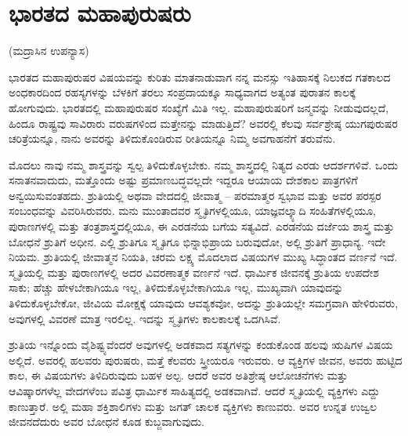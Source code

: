 
\chapter{ಭಾರತದ ಮಹಾಪುರುಷರು}

\begin{center}
(ಮದ್ರಾಸಿನ ಉಪನ್ಯಾಸ)
\end{center}

ಭಾರತದ ಮಹಾಪುರುಷರ ವಿಷಯವನ್ನು ಕುರಿತು ಮಾತನಾಡುವಾಗ ನನ್ನ ಮನಸ್ಸು ಇತಿಹಾಸಕ್ಕೆ ನಿಲುಕದ ಗತಕಾಲದ ಅಂಧಕಾರದಿಂದ ರಹಸ್ಯಗಳನ್ನು ಬೆಳಕಿಗೆ ತರಲು ಸಂಪ್ರದಾಯಕ್ಕೂ ಸಾಧ್ಯವಾಗದ ಅತ್ಯಂತ ಪುರಾತನ ಕಾಲಕ್ಕೆ ಹೋಗುವುದು. ಭಾರತದಲ್ಲಿ ಮಹಾಪುರುಷರ ಸಂಖ್ಯೆಗೆ ಮಿತಿ ಇಲ್ಲ. ಮಹಾಪುರುಷರಿಗೆ ಜನ್ಮವನ್ನು ನೀಡುವುದಲ್ಲದೆ, ಹಿಂದೂ ರಾಷ್ಟ್ರವು ಸಾವಿರಾರು ವರುಷಗಳಿಂದ ಮತ್ತೇನನ್ನು ಮಾಡುತ್ತಿದೆ? ಅವರಲ್ಲಿ ಕೆಲವು ಸರ್ವಶ್ರೇಷ್ಠ ಯುಗಪುರುಷರ ಚರಿತ್ರೆಯನ್ನೂ, ನಾನು ಅವರನ್ನು ತಿಳಿದುಕೊಂಡಿರುವ ರೀತಿಯನ್ನೂ ನಿಮ್ಮ ಅವಗಾಹನೆಗೆ ತರುವೆನು. 

ಮೊದಲು ನಾವು ನಮ್ಮ ಶಾಸ್ತ್ರವನ್ನು ಸ್ವಲ್ಪ ತಿಳಿದುಕೊಳ್ಳಬೇಕು. ನಮ್ಮ ಶಾಸ್ತ್ರದಲ್ಲಿ ನಿತ್ಯದ ಎರಡು ಆದರ್ಶಗಳಿವೆ. ಒಂದು ಸನಾತನವಾದುದು, ಮತ್ತೊಂದು ಅಷ್ಟು ಪ್ರಮಾಣಬದ್ಧವಲ್ಲದೇ ಇದ್ದರೂ ಆಯಾಯ ದೇಶಕಾಲ ಪಾತ್ರಗಳಿಗೆ ಅನ್ವಯಿಸುವಂತಹದು. ಶ್ರುತಿಯಲ್ಲಿ ಅಥವಾ ವೇದದಲ್ಲಿ ಜೀವಾತ್ಮ – ಪರಮಾತ್ಮರ ಸ್ವಭಾವ ಮತ್ತು ಅವರ ಪರಸ್ಪರ ಸಂಬಂಧವನ್ನು ವಿವರಿಸಿರುವರು. ಮನು ಮುಂತಾದವರ ಸ್ಮೃತಿಗಳಲ್ಲಿಯೂ, ಯಾಜ್ಞವಲ್ಕ್ಯಾದಿ ಸಂಹಿತೆಗಳಲ್ಲಿಯೂ, ಪುರಾಣಗಳಲ್ಲಿ ಮತ್ತು ತಂತ್ರಶಾಸ್ತ್ರದಲ್ಲಿಯೂ, ಈ ಎರಡನೆಯ ಬಗೆಯ ಸತ್ಯವಿದೆ. ಎರಡನೆಯ ದರ್ಜೆಯ ಶಾಸ್ತ್ರ ಮತ್ತು ಬೋಧನೆ ಶ್ರುತಿಗೆ ಅಧೀನ. ಎಲ್ಲಿ ಶ್ರುತಿಗೂ ಸ್ಮೃತಿಗೂ ಭಿನ್ನಾಭಿಪ್ರಾಯ ಬರುವುದೋ, ಅಲ್ಲಿ ಶ್ರುತಿಗೆ ಪ್ರಾಧಾನ್ಯ. ಇದೇ ನಿಯಮ. ಶ್ರುತಿಯಲ್ಲಿ ಜೀವಾತ್ಮನ ನಿಯತಿ, ಚರಮ ಲಕ್ಷ್ಯ ಮೊದಲಾದ ವಿಷಯಗಳ ಮುಖ್ಯ ಸಿದ್ಧಾಂತದ ವರ್ಣನೆ ಇದೆ. ಸ್ಮೃತಿಯಲ್ಲಿ ಮತ್ತು ಪುರಾಣಗಳಲ್ಲಿ ಅದರ ವಿವರಣಾತ್ಮಕ ವರ್ಣನೆ ಇದೆ. ಧಾರ್ಮಿಕ ಜೀವನಕ್ಕೆ ಶ್ರುತಿಯ ಉಪದೇಶ ಸಾಕು; ಹೆಚ್ಚು ಹೇಳಬೇಕಾಗಿಯೂ ಇಲ್ಲ, ತಿಳಿದುಕೊಳ್ಳಬೇಕಾಗಿಯೂ ಇಲ್ಲ. ಮುಖ್ಯವಾಗಿ ಯಾವುದನ್ನು ತಿಳಿದುಕೊಳ್ಳಬೇಕೋ, ಜೀವಿಯ ಮೋಕ್ಷಕ್ಕೆ ಯಾವುದು ಆವಶ್ಯಕವೋ, ಅದನ್ನು ಶ್ರುತಿಯಲ್ಲೇ ಸಮಗ್ರವಾಗಿ ಹೇಳಿರುವರು, ಅವುಗಳಲ್ಲಿ ವಿವರಣೆ ಮಾತ್ರ ಇರಲಿಲ್ಲ. ಇದನ್ನು ಸ್ಮೃತಿಗಳು ಕಾಲಕಾಲಕ್ಕೆ ಒದಗಿಸಿವೆ. 

ಶ್ರುತಿಯ ಇನ್ನೊಂದು ವೈಶಿಷ್ಟ್ಯವೆಂದರೆ ಅವುಗಳಲ್ಲಿ ಅಡಕವಾದ ಸತ್ಯಗಳನ್ನು ಕಂಡುಕೊಂಡ ಹಲವು ಋಷಿಗಳ ವಿಷಯ ಅಲ್ಲಿದೆ. ಅವರಲ್ಲಿ ಹಲವರು ಪುರುಷರು, ಮತ್ತೆ ಕೆಲವರು ಸ್ತ್ರೀಯರೂ ಇರುವರು. ಆ ವ್ಯಕ್ತಿಗಳ ಜೀವನ, ಅವರು ಹುಟ್ಟಿದ ಕಾಲ, ಈ ವಿಷಯಗಳು ತಿಳಿದಿರುವುದು ಬಹಳ ಅಲ್ಪ. ಆದರೆ ಅವರ ಅತಿಶ್ರೇಷ್ಠ ಆಲೋಚನೆಗಳು ಮತ್ತು ಆವಿಷ್ಕಾರಗಳೆಲ್ಲ ವೇದಗಳೆಂಬ ಪವಿತ್ರ ಧಾರ್ಮಿಕ ಸಾಹಿತ್ಯದಲ್ಲಿ ಅಡಕವಾಗಿವೆ. ಆದರೆ ಸ್ಮೃತಿಯಲ್ಲಿ ವ್ಯಕ್ತಿಗಳು ಎದ್ದು ಕಾಣುತ್ತಾರೆ. ಅಲ್ಲಿ ಮಹಾ ಶಕ್ತಿಶಾಲಿಗಳು ಮತ್ತು ಜಗತ್​ ಚಾಲಕ ವ್ಯಕ್ತಿಗಳು ಕಾಣುವರು. ಅವರ ಉನ್ನತ ಉಜ್ವಲ ಜೀವನದೆದುರು ಅವರ ಬೋಧನೆ ಕೂಡ ಕುಬ್ಜವಾಗುವುದು. 

